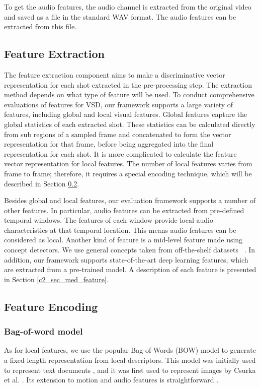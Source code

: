 To get the audio features, the audio channel is extracted from the original video and saved as a file in the standard WAV format. The audio features can be extracted from this file.

\subsection{Feature Extraction}

The feature extraction component aims to make a discriminative vector representation for each shot extracted in the pre-processing step. The extraction method depends on what type of feature will be used. To conduct comprehensive evaluations of features for VSD, our framework supports a large variety of features, including global and local visual features. Global features capture the global statistics of each extracted shot. These statistics can be calculated directly from sub regions of a sampled frame and concatenated to form the vector representation for that frame, before being aggregated into the final representation for each shot. It is more complicated to calculate the feature vector representation for local features. The number of local features varies from frame to frame; therefore, it requires a special encoding technique, which will be described in Section \ref{c2_sec_feature_encoding}.

Besides global and local features, our evaluation framework supports a number of other features. In particular, audio features can be extracted from pre-defined temporal windows. The features of each window provide local audio characteristics at that temporal location. This means audio features can be considered as local. Another kind of feature is a mid-level feature made using concept detectors. We use general concepts taken from off-the-shelf datasets ~\cite{deng2009imagenet}. In addition, our framework supports state-of-the-art deep learning features, which are extracted from a pre-trained model. A description of each feature is presented in Section \ref{c2_sec_med_feature}.

\subsection{Feature Encoding}
\label{c2_sec_feature_encoding}

\subsubsection{Bag-of-word model}
As for local features, we use the popular Bag-of-Words (BOW) model to generate a fixed-length representation from local descriptors. This model was initially used to represent text documents \cite{harris1954distributional}, and it was first used to represent images by Csurka et al. \cite{Csurka04visualcategorization}. Its extension to motion and audio features is straightforward \cite{sivic2009efficient,jiang2010columbia}.

